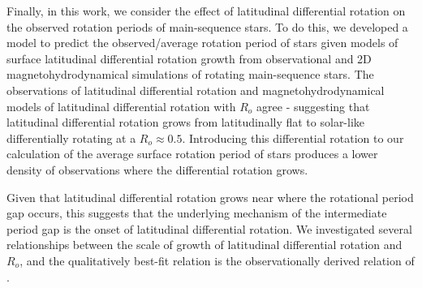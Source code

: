 Finally, in this work, we consider the effect of latitudinal differential rotation on the observed rotation periods of main-sequence stars.
To do this, we developed a model to predict the observed/average rotation period of stars given models of surface latitudinal differential rotation growth from observational and 2D magnetohydrodynamical simulations of rotating main-sequence stars.
The observations of latitudinal differential rotation and magnetohydrodynamical models of latitudinal differential rotation with $R_o$ agree - suggesting that latitudinal differential rotation grows from latitudinally flat to solar-like differentially rotating at a $R_o \approx 0.5$.
Introducing this differential rotation to our calculation of the average surface rotation period of stars produces a lower density of observations where the differential rotation grows.

Given that latitudinal differential rotation grows near where the rotational period gap occurs, this suggests that the underlying mechanism of the intermediate period gap is the onset of latitudinal differential rotation.
We investigated several relationships between the scale of growth of latitudinal differential rotation and $R_o$, and the qualitatively best-fit relation is the observationally derived relation of \citet{saar_starspots_2011}.

